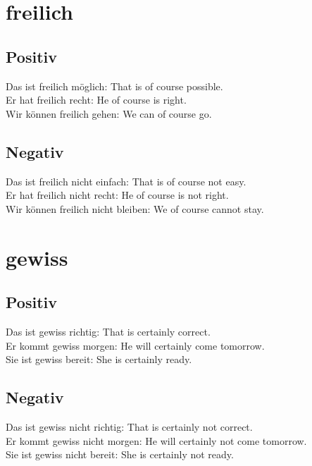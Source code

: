 \documentclass[a4paper]{article}
\begin{document}
    
    \section{freilich}
        
        \subsection{Positiv}
            Das ist freilich möglich: That is of course possible. \\
            Er hat freilich recht: He of course is right. \\
            Wir können freilich gehen: We can of course go. \\
        
        \subsection{Negativ}
            Das ist freilich nicht einfach: That is of course not easy. \\
            Er hat freilich nicht recht: He of course is not right. \\
            Wir können freilich nicht bleiben: We of course cannot stay. \\
    
    
    \section{gewiss}
        
        \subsection{Positiv}
            Das ist gewiss richtig: That is certainly correct. \\
            Er kommt gewiss morgen: He will certainly come tomorrow. \\
            Sie ist gewiss bereit: She is certainly ready. \\
        
        \subsection{Negativ}
            Das ist gewiss nicht richtig: That is certainly not correct. \\
            Er kommt gewiss nicht morgen: He will certainly not come tomorrow. \\
            Sie ist gewiss nicht bereit: She is certainly not ready. \\
    
\end{document}
